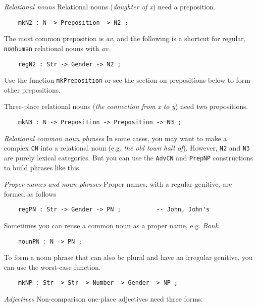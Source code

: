 \documentclass[11pt,a4paper]{article}
\newcommand{\subsubsubsection}[1]{\textit{#1}}
\begin{document}
\subsubsubsection{Relational nouns}
Relational nouns (\textit{daughter of x}) need a preposition. 

\begin{verbatim}
    mkN2 : N -> Preposition -> N2 ;
\end{verbatim}

The most common preposition is \textit{av}, and the following is a
shortcut for regular, \texttt{nonhuman} relational nouns with \textit{av}.

\begin{verbatim}
    regN2 : Str -> Gender -> N2 ;
\end{verbatim}

Use the function \texttt{mkPreposition} or see the section on prepositions below to  
form other prepositions.

Three-place relational nouns (\textit{the connection from x to y}) need two prepositions.

\begin{verbatim}
    mkN3 : N -> Preposition -> Preposition -> N3 ;
\end{verbatim}

\subsubsubsection{Relational common noun phrases}
In some cases, you may want to make a complex \texttt{CN} into a
relational noun (e.g. \textit{the old town hall of}). However, \texttt{N2} and
\texttt{N3} are purely lexical categories. But you can use the \texttt{AdvCN}
and \texttt{PrepNP} constructions to build phrases like this.

\subsubsubsection{Proper names and noun phrases}
Proper names, with a regular genitive, are formed as follows

\begin{verbatim}
    regPN : Str -> Gender -> PN ;          -- John, John's
\end{verbatim}

Sometimes you can reuse a common noun as a proper name, e.g. \textit{Bank}.

\begin{verbatim}
    nounPN : N -> PN ;
\end{verbatim}

To form a noun phrase that can also be plural and have an irregular
genitive, you can use the worst-case function.

\begin{verbatim}
    mkNP : Str -> Str -> Number -> Gender -> NP ; 
\end{verbatim}

\subsubsubsection{Adjectives}
Non-comparison one-place adjectives need three forms: 
\end{document}

